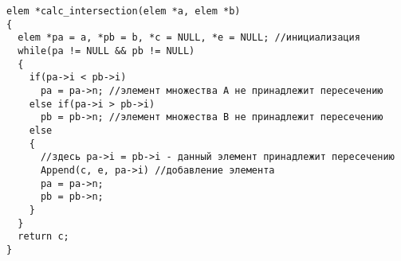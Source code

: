 \documentclass[a5paper]{article}
\begin{document}

\begin{lstlisting}
elem *calc_intersection(elem *a, elem *b)
{
  elem *pa = a, *pb = b, *c = NULL, *e = NULL; //инициализация
  while(pa != NULL && pb != NULL)
  {
    if(pa->i < pb->i)
      pa = pa->n; //элемент множества A не принадлежит пересечению
    else if(pa->i > pb->i)
      pb = pb->n; //элемент множества B не принадлежит пересечению
    else
    {
      //здесь pa->i = pb->i - данный элемент принадлежит пересечению
      Append(c, e, pa->i) //добавление элемента
      pa = pa->n;
      pb = pb->n;
    }
  }
  return c;
}
\end{lstlisting}
\end{document}
